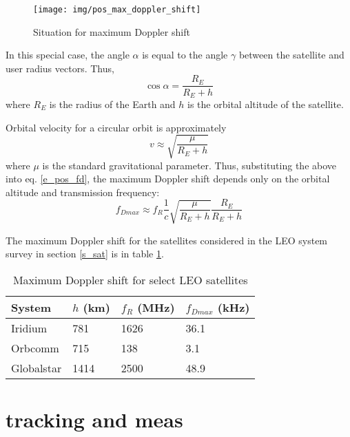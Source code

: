 \begin{figure}
    \centering
    \texttt{[image: img/pos\_max\_doppler\_shift]}
    \caption{Situation for maximum Doppler shift}
    \label{f_pos_max_doppler_shift}
\end{figure}

In this special case, the angle $\alpha$ is equal to the angle $\gamma$ between the satellite and user radius vectors. Thus,
\begin{equation*}
    \cos{\alpha} = \frac{R_E}{R_E + h}
\end{equation*}
where $R_E$ is the radius of the Earth and $h$ is the orbital altitude of the satellite.

Orbital velocity for a circular orbit is approximately
\begin{equation*}
    v \approx \sqrt{\frac{\mu}{R_E + h}}
\end{equation*}
where $\mu$ is the standard gravitational parameter. Thus, substituting the above into eq. \ref{e_pos_fd}, the maximum Doppler shift depends only on the orbital altitude and transmission frequency:
\begin{equation}
    \label{e_pos_fd_max}
    f_{D max} \approx f_R \frac{1}{c} \sqrt{\frac{\mu}{R_E + h}} \frac{R_E}{R_E + h}
\end{equation}

The maximum Doppler shift for the satellites considered in the LEO system survey in section \ref{s_sat} is in table \ref{t_pos_max_fd}.

\begin{table}
    \centering
    \begin{tabular}{llll}
    System     & $h$ (km) &  $f_R$ (MHz) & $f_{Dmax}$ (kHz) \\ \hline
    Iridium    &  781  &  1626 & \num{36.1} \\
    Orbcomm    &  715  &  138  & \num{3.1} \\
    Globalstar &  1414 &  2500 & \num{48.9}
    \end{tabular}
    \caption{Maximum Doppler shift for select LEO satellites}
    \label{t_pos_max_fd}
\end{table}

\section{tracking and meas}
\label{s_pos_tracking_satellite}

